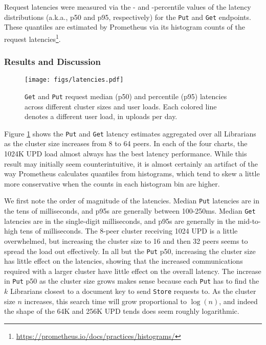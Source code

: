 \documentclass[10pt]{article}
\newcommand{\ttt}[1]{\texttt{#1}}
\def\Put{\ttt{Put}}
\def\Get{\ttt{Get}}
\begin{document}
Request latencies were measured via the - and -percentile values of the latency distributions (a.k.a., p50 and p95, respectively) for the \ttt{Put} and \texttt{Get} endpoints. These quantiles are estimated by Prometheus via its histogram counts of the request latencies\footnote{\url{https://prometheus.io/docs/practices/histograms/}}.  

\subsubsection{Results and Discussion}

\begin{figure}[t]
	\centering
	\texttt{[image: figs/latencies.pdf]}
	\caption{\Get{} and \Put{} request median (p50) and  percentile (p95) latencies across different cluster sizes and user loads. Each colored line denotes a different user load, in uploads per day.}
	\label{fig:latencies}
\end{figure}

Figure \ref{fig:latencies} shows the \ttt{Put} and \texttt{Get} latency estimates aggregated over all Librarians as the cluster size increases from 8 to 64 peers. In each of the four charts, the 1024K UPD load almost always has the best latency performance. While this result may initially seem counterintuitive, it is almost certainly an artifact of the way Prometheus calculates quantiles from histograms, which tend to skew a little more conservative when the counts in each histogram bin are higher. 

We first note the order of magnitude of the latencies. Median \ttt{Put} latencies are in the tens of milliseconds, and p95s are generally between 100-250ms. Median \texttt{Get} latencies are in the single-digit milliseconds, and p95s are generally in the mid-to-high tens of milliseconds. The 8-peer cluster receiving 1024 UPD is a little overwhelmed, but increasing the cluster size to 16 and then 32 peers seems to spread the load out effectively. In all but the \texttt{Put} p50, increasing the cluster size has little effect on the latencies, showing that the increased communications required with a larger cluster have little effect on the overall latency. The increase in \texttt{Put} p50 as the cluster size grows makes sense because each \texttt{Put} has to find the $k$ Librarians closest to a document key to send \texttt{Store} requests to. As the cluster size $n$ increases, this search time will grow proportional to $\log(n)$, and indeed the shape of the 64K and 256K UPD tends does seem roughly logarithmic. 
\end{document}
